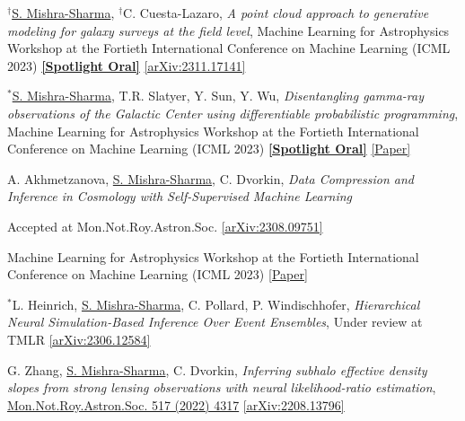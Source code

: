 \documentclass[letterpaper,11pt]{article}
\newenvironment{packed_itemize}{
\begin{itemize}[label=\raisebox{0.25ex}{\tiny$\bullet$}]
  \setlength{\itemsep}{4.2pt}
  \setlength{\parskip}{0pt}
  \setlength{\parsep}{0pt}}{\end{itemize}
}
\newenvironment{packed_enumerate}[1][]{
\begin{etaremune}[#1]
  \setlength{\itemsep}{3.7pt}
  \setlength{\parskip}{0pt}
  \setlength{\parsep}{0pt}}{\end{etaremune}
}
\begin{document}
\begin{packed_enumerate}[start=37]

  \item $^{\dagger}$\underline{S. Mishra-Sharma}, $^{\dagger}$C. Cuesta-Lazaro, \emph{A point cloud approach to generative modeling for galaxy surveys at the field level}, {Machine Learning for Astrophysics Workshop at the Fortieth International Conference on Machine Learning (ICML 2023)} \href{https://ml4astro.github.io/icml2023/}{\textbf{[Spotlight Oral]}}  \href{https://arxiv.org/abs/2311.17141}{[arXiv:2311.17141]}  %

  \item $^*$\underline{S. Mishra-Sharma}, T.R. Slatyer, Y. Sun, Y. Wu, \emph{Disentangling gamma-ray observations of the Galactic Center using differentiable probabilistic programming}, {Machine Learning for Astrophysics Workshop at the Fortieth International Conference on Machine Learning (ICML 2023)} \href{https://ml4astro.github.io/icml2023/}{\textbf{[Spotlight Oral]}} \href{https://ml4astro.github.io/icml2023/assets/52.pdf}{[Paper]}

  \item A. Akhmetzanova, \underline{S. Mishra-Sharma}, C. Dvorkin, \emph{Data Compression and Inference in Cosmology with Self-Supervised Machine Learning}
  \begin{packed_itemize}
      \item {Accepted at Mon.Not.Roy.Astron.Soc.} \href{https://arxiv.org/abs/2308.09751}{[arXiv:2308.09751]}
      \item {Machine Learning for Astrophysics Workshop at the Fortieth International Conference on Machine Learning (ICML 2023)} \href{https://ml4astro.github.io/icml2023/assets/11.pdf}{[Paper]} 
       \end{packed_itemize}
    
  \item $^*$L. Heinrich, \underline{S. Mishra-Sharma}, C. Pollard, P. Windischhofer, \emph{Hierarchical Neural Simulation-Based Inference Over Event Ensembles}, Under review at TMLR \href{https://arxiv.org/abs/2306.12584}{[arXiv:2306.12584]}
  
  \item G. Zhang, \underline{S. Mishra-Sharma}, C. Dvorkin, \emph{Inferring subhalo effective density slopes from strong lensing observations with neural likelihood-ratio estimation}, \href{https://doi.org/10.1093/mnras/stac3014}{Mon.Not.Roy.Astron.Soc. 517 (2022) 4317} \href{https://arxiv.org/abs/2208.13796}{[arXiv:2208.13796]}


\end{packed_enumerate}
\end{document}
